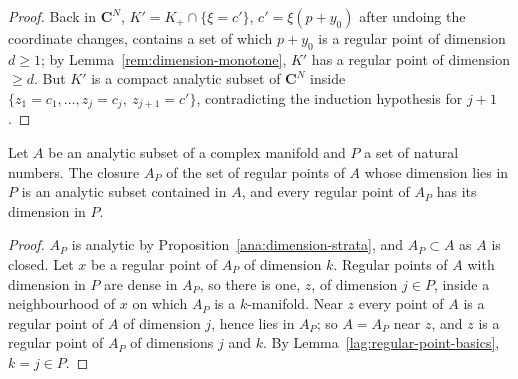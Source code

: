 \begin{proof}
Back in \(\mathbf C^N\), \(K'=K_+\cap\{\xi=c'\}\), \(c'=\xi(p+y_0)\) after undoing the coordinate changes, contains a set of which \(p+y_0\) is a regular point of
dimension \(d\ge1\); by Lemma~\ref{rem:dimension-monotone}, \(K'\) has a regular point of dimension \(\ge d\). But \(K'\) is a compact analytic subset of \(\mathbf C^N\)
inside \(\{z_1=c_1,\dots,z_j=c_j,\ z_{j+1}=c'\}\), contradicting the induction hypothesis for \(j+1\).
\end{proof}

\begin{lemma}
\label{rem:stratum-hull}
\leanok
Let \(A\) be an analytic subset of a complex manifold and \(P\) a set of natural numbers. The closure \(A_P\) of the set of regular points of \(A\) whose
dimension lies in \(P\) is an analytic subset contained in \(A\), and every regular point of \(A_P\) has its dimension in \(P\).
\end{lemma}
\begin{proof}
\leanok
\(A_P\) is analytic by Proposition~\ref{ana:dimension-strata}, and \(A_P\subset A\) as \(A\) is closed. Let \(x\) be a regular point of \(A_P\) of dimension \(k\).
Regular points of \(A\) with dimension in \(P\) are dense in \(A_P\), so there is one, \(z\), of dimension \(j\in P\), inside a neighbourhood of \(x\) on which
\(A_P\) is a \(k\)-manifold. Near \(z\) every point of \(A\) is a regular point of \(A\) of dimension \(j\), hence lies in \(A_P\); so \(A=A_P\) near \(z\), and
\(z\) is a regular point of \(A_P\) of dimensions \(j\) and \(k\). By Lemma~\ref{lag:regular-point-basics}, \(k=j\in P\).
\end{proof}

